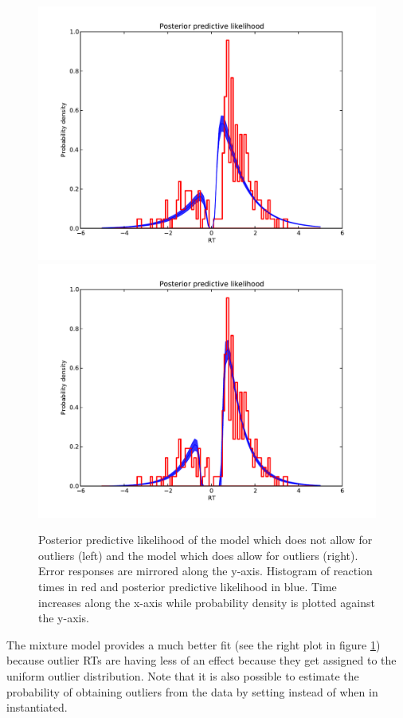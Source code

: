 \documentclass[letterpaper,10pt,english]{article}
\begin{document}
\begin{figure}
\includegraphics[width=0.5\columnwidth]{hddm_demo_fig_10.pdf}
\includegraphics[width=0.5\columnwidth]{hddm_demo_fig_11.pdf}
\caption{Posterior predictive likelihood of the model which does not allow for outliers (left) and the model which does allow for outliers (right). Error responses are mirrored along the y-axis. Histogram of reaction times in red and posterior predictive likelihood in blue. Time increases along the x-axis while probability density is plotted against the y-axis. }
\label{fig.outliers}
\end{figure}


The mixture model provides a much better fit (see the right plot in figure \ref{fig.outliers}) because outlier RTs are having less of an effect because they get assigned to the uniform outlier distribution. Note that it is also possible to estimate the probability of obtaining outliers from the data by setting  instead of  when  in instantiated.




\end{document}
